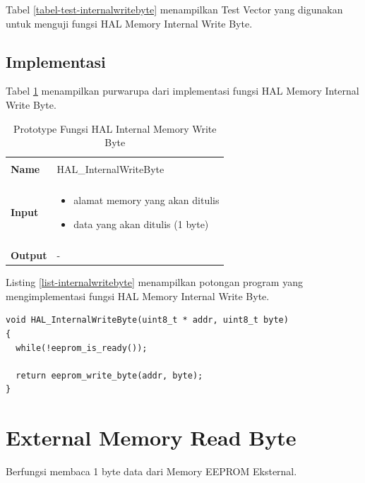 Tabel \ref{tabel-test-internalwritebyte} menampilkan Test Vector yang digunakan untuk menguji fungsi HAL Memory Internal Write Byte.

\subsection {Implementasi}

Tabel \ref{tabel-internalwritebyte} menampilkan purwarupa dari implementasi fungsi HAL Memory Internal Write Byte. 

\begin{table}[!h]
  \centering
  \begin{tabular}{p{2cm} p{8cm}}
    \hline\\
    {\bf Name} & HAL\_InternalWriteByte\\
    \hline\\
    {\bf Input} & 
    \begin{itemize}[noitemsep,topsep=0pt,parsep=0pt,partopsep=0pt]
    \item alamat memory yang akan ditulis
    \item data yang akan ditulis (1 byte)
    \end{itemize}
    \\
    \hline\\
    {\bf Output} & -
    \\
    \hline
  \end{tabular}
  \caption{Prototype Fungsi HAL Internal Memory Write Byte}
  \label{tabel-internalwritebyte}
\end{table}

Listing \ref{list-internalwritebyte} menampilkan potongan program yang mengimplementasi fungsi HAL Memory Internal Write Byte.

\begin{lstlisting}[caption={Listing Program Fungsi HAL Memory Internal Write Byte}, label={list-internalwritebyte}]
void HAL_InternalWriteByte(uint8_t * addr, uint8_t byte)
{
  while(!eeprom_is_ready());

  return eeprom_write_byte(addr, byte);
}
\end{lstlisting}

\section{External Memory Read Byte}
\label{sec_externalmemoryreadbyte}

Berfungsi membaca 1 byte data dari Memory EEPROM Eksternal.

